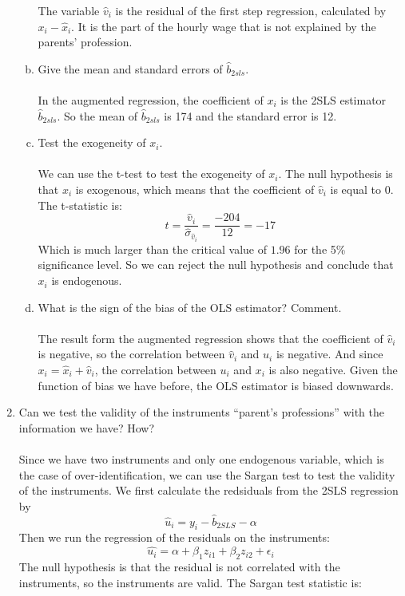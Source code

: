 \documentclass[12pt]{article}
\begin{document}
\begin{flushleft}
\begin{enumerate}
\begin{enumerate}[(a)]
    The variable $\hat{v}_i$ is the residual of the first step regression, calculated by $x_i-\hat{x}_i$. It is the part of the hourly wage that is not explained by the parents' profession.\\
    \item Give the mean and standard errors of $\hat{b}_{2sls}$.\\~\\
    In the augmented regression, the coefficient of $x_i$ is the 2SLS estimator $\hat{b}_{2sls}$. So the mean of $\hat{b}_{2sls}$ is 174 and the standard error is 12.\\
    \item Test the exogeneity of $x_i$.\\~\\
    We can use the t-test to test the exogeneity of $x_i$. The null hypothesis is that $x_i$ is exogenous, which means that the coefficient of $\hat{v}_i$ is equal to 0. The t-statistic is:
    \[
    t=\frac{\hat{v}_i}{\hat{\sigma}_{\hat{v}_i}}=\frac{-204}{12}=-17
    \]
    Which is much larger than the critical value of $1.96$ for the 5\% significance level. So we can reject the null hypothesis and conclude that $x_i$ is endogenous.\\
    \item What is the sign of the bias of the OLS estimator? Comment.\\~\\
    The result form the augmented regression shows that the coefficient of $\hat{v}_i$ is negative, so the correlation between $\hat{v}_i$ and $u_i$ is negative. And since $x_i=\hat{x}_i+\hat{v}_i$, the correlation between $u_i$ and $x_i$ is also negative. Given the function of bias we have before, the OLS estimator is biased downwards.\\
    \end{enumerate} 
    \item Can we test the validity of the instruments “parent’s professions” with the information we have? How?\\~\\
    Since we have two instruments and only one endogenous variable, which is the case of over-identification, we can use the Sargan test to test the validity of the instruments. We first calculate the redsiduals from the 2SLS regression by 
    \[
    \hat{u}_i=y_i-\hat{b}_{2SLS}-\alpha
    \]
    Then we run the regression of the residuals on the instruments:
    \[
    \hat{u_i}=\alpha+\beta_1z_{i1}+\beta_2z_{i2}+\epsilon_i
    \]
    The null hypothesis is that the residual is not correlated with the instruments, so the instruments are valid. The Sargan test statistic is:

\end{enumerate}
\end{flushleft}
\end{document}
